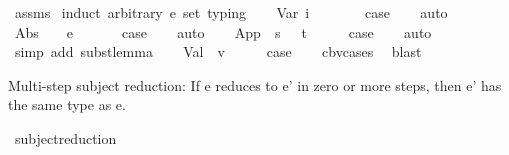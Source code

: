 \begin{isabellebody}
%
\isadelimproof
%
\endisadelimproof
%
\isatagproof
{}\isamarkupfalse%
\ assms\isanewline
{}\isamarkupfalse%
\ {\isacharparenleft}{\kern0pt}induct\ arbitrary{\isacharcolon}{\kern0pt}\ e{\isacharprime}{\kern0pt}\ set{\isacharcolon}{\kern0pt}\ typing{\isacharparenright}{\kern0pt}\isanewline
\ \ \isamarkupfalse%
\ {\isacharparenleft}{\kern0pt}Var\ i\ {\isasymGamma}\ {\isasymtau}{\isacharparenright}{\kern0pt}\isanewline
\ \ \isamarkupfalse%
\ \isamarkupfalse%
\ {\isacharquery}{\kern0pt}case\isanewline
\ \ \isamarkupfalse%
\ auto\isanewline
{}\isamarkupfalse%
\isanewline
\ \ \isamarkupfalse%
\ {\isacharparenleft}{\kern0pt}Abs\ {\isasymtau}{\isacharprime}{\kern0pt}\ {\isasymtau}\ {\isasymGamma}\ e\ {\isasymtau}{}{\isacharparenright}{\kern0pt}\isanewline
\ \ \isamarkupfalse%
\ \isamarkupfalse%
\ {\isacharquery}{\kern0pt}case\isanewline
\ \ \isamarkupfalse%
\ auto\isanewline
{}\isamarkupfalse%
\isanewline
\ \ \isamarkupfalse%
\ {\isacharparenleft}{\kern0pt}App\ {\isasymGamma}\ s\ {\isasymtau}\ {\isasymtau}{}\ t{\isacharparenright}{\kern0pt}\isanewline
\ \ \isamarkupfalse%
\ \isamarkupfalse%
\ {\isacharquery}{\kern0pt}case\isanewline
\ \ \isamarkupfalse%
\ auto\isanewline
\ \ \isamarkupfalse%
\ {\isacharparenleft}{\kern0pt}simp\ add{\isacharcolon}{\kern0pt}\ subst{\isacharunderscore}{\kern0pt}lemma{\isacharparenright}{\kern0pt}\isanewline
{}\isamarkupfalse%
\isanewline
\ \ \isamarkupfalse%
\ {\isacharparenleft}{\kern0pt}Val\ {\isasymGamma}\ v{\isacharparenright}{\kern0pt}\isanewline
\ \ \isamarkupfalse%
\ \isamarkupfalse%
\ {\isacharquery}{\kern0pt}case\isanewline
\ \ \isamarkupfalse%
\ cbv{\isachardot}{\kern0pt}cases\ \isamarkupfalse%
\ blast\isanewline
{}\isamarkupfalse%
%
\endisatagproof
{\isafoldproof}%
%
\isadelimproof
%
\endisadelimproof
%
\begin{isamarkuptext}%
Multi-step subject reduction:
  If e reduces to e' in zero or more steps,
  then e' has the same type as e.%
\end{isamarkuptext}\isamarkuptrue%
\isamarkupfalse%
\ subject{\isacharunderscore}{\kern0pt}reduction{\isacharprime}{\kern0pt}{\isacharcolon}{\kern0pt}\isanewline

\end{isabellebody}

